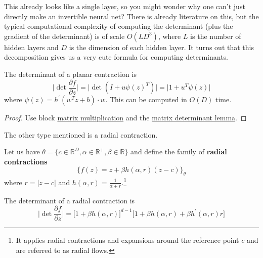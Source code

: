\documentclass{article}
\begin{document}
  This already looks like a single layer, so you might wonder why one can't just directly make an invertible neural net? There is already literature on this, but the typical computational complexity of computing the determinant (plus the gradient of the determinant) is of scale $O(LD^3)$, where $L$ is the number of hidden layers and $D$ is the dimension of each hidden layer. It turns out that this decomposition gives us a very cute formula for computing determinants. 

  \begin{lemma}
    \label{thm:determinant-of-a-planar-contraction}
    The determinant of a planar contraction is 
    \begin{equation}
      \bigg| \det \frac{\partial f}{\partial z} \bigg| = \big| \det (I + u \psi (z)^T ) \big| = \big| 1 + u^T \psi(z) \big| 
    \end{equation} 
    where $\psi(z) = h^\prime (w^T z + b) \cdot w$. This can be computed in $O(D)$ time. 
  \end{lemma}
  \begin{proof}
    Use block \hyperref[lin-def:matrix-multiplication]{matrix multiplication} and the \href{https://en.wikipedia.org/wiki/Matrix_determinant_lemma}{matrix determinant lemma}.
  \end{proof}

  The other type mentioned is a radial contraction. 

  \begin{definition}
    \label{def:radial-contraction}
    Let us have $\theta = \{ c \in \mathbb{R}^D, \alpha \in \mathbb{R}^+, \beta \in \mathbb{R} \}$ and define the family of \textbf{radial contractions} 
    \begin{equation}
      \{ f(z) = z + \beta h(\alpha, r) (z - c) \}_\theta
    \end{equation}
    where $r = |z - c|$ and $h(\alpha, r) = \frac{1}{\alpha + r}$.\footnote{It applies radial contractions and expansions around the reference point $c$ and are referred to as radial flows. }
  \end{definition}

  \begin{lemma}
    \label{thm:determinant-of-a-radial-contraction}
 
    The determinant of a radial contraction is 
    \begin{equation}
      \bigg| \det \frac{\partial f}{\partial z} \bigg| = \big[ 1 + \beta h(\alpha, r)\big]^{d-1} \big[ 1 + \beta h(\alpha, r) + \beta h^\prime (\alpha, r) r \big]
    \end{equation}
  \end{lemma}
\end{document}
